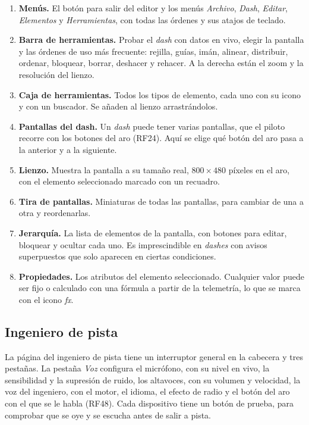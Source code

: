 \begin{enumerate}
	\item \textbf{Menús.} El botón para salir del editor y los menús \textit{Archivo}, \textit{Dash}, \textit{Editar}, \textit{Elementos} y \textit{Herramientas}, con todas las órdenes y sus atajos de teclado.
	\item \textbf{Barra de herramientas.} Probar el \textit{dash} con datos en vivo, elegir la pantalla y las órdenes de uso más frecuente: rejilla, guías, imán, alinear, distribuir, ordenar, bloquear, borrar, deshacer y rehacer. A la derecha están el zoom y la resolución del lienzo.
	\item \textbf{Caja de herramientas.} Todos los tipos de elemento, cada uno con su icono y con un buscador. Se añaden al lienzo arrastrándolos.
	\item \textbf{Pantallas del dash.} Un \textit{dash} puede tener varias pantallas, que el piloto recorre con los botones del aro (RF24). Aquí se elige qué botón del aro pasa a la anterior y a la siguiente.
	\item \textbf{Lienzo.} Muestra la pantalla a su tamaño real, $800\times480$ píxeles en el aro, con el elemento seleccionado marcado con un recuadro.
	\item \textbf{Tira de pantallas.} Miniaturas de todas las pantallas, para cambiar de una a otra y reordenarlas.
	\item \textbf{Jerarquía.} La lista de elementos de la pantalla, con botones para editar, bloquear y ocultar cada uno. Es imprescindible en \textit{dashes} con avisos superpuestos que solo aparecen en ciertas condiciones.
	\item \textbf{Propiedades.} Los atributos del elemento seleccionado. Cualquier valor puede ser fijo o calculado con una fórmula a partir de la telemetría, lo que se marca con el icono \textit{fx}.
\end{enumerate}

\subsection{Ingeniero de pista}
\label{subsec:ui-ingeniero}
La página del ingeniero de pista tiene un interruptor general en la cabecera y tres pestañas. La pestaña \textit{Voz} configura el micrófono, con su nivel en vivo, la sensibilidad y la supresión de ruido, los altavoces, con su volumen y velocidad, la voz del ingeniero, con el motor, el idioma, el efecto de radio y el botón del aro con el que se le habla (RF48). Cada dispositivo tiene un botón de prueba, para comprobar que se oye y se escucha antes de salir a pista.

